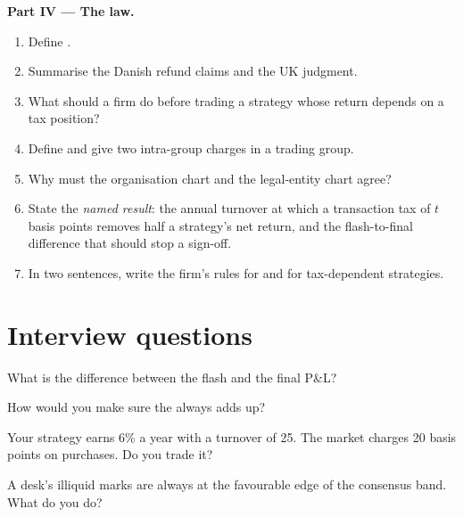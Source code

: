 \begin{problem}
\medskip\noindent\textbf{Part IV --- The law.}
\begin{enumerate}[resume]
\item Define .
\item Summarise the Danish refund claims and the UK judgment.
\item What should a firm do before trading a strategy whose return depends on a tax position?
\item Define  and give two intra-group charges in a trading group.
\item Why must the organisation chart and the legal-entity chart agree?
\item State the \emph{named result}: the annual turnover at which a transaction tax of $t$ basis points removes half a strategy's net return, and
the flash-to-final difference that should stop a sign-off.
\item In two sentences, write the firm's rules for  and for tax-dependent strategies.
\end{enumerate}
\end{problem}

\section{Interview questions}

\begin{interviewq}\label{iq:fm:finance-product-control-and-tax:1}
What is the difference between the flash and the final P\&L?
\end{interviewq}

\begin{interviewq}\label{iq:fm:finance-product-control-and-tax:2}
How would you make sure the  always adds up?
\end{interviewq}

\begin{interviewq}\label{iq:fm:finance-product-control-and-tax:3}
Your strategy earns 6\% a year with a turnover of 25. The market charges 20 basis points on purchases. Do you trade it?
\end{interviewq}

\begin{interviewq}\label{iq:fm:finance-product-control-and-tax:4}
A desk's illiquid marks are always at the favourable edge of the consensus band. What do you do?
\end{interviewq}

